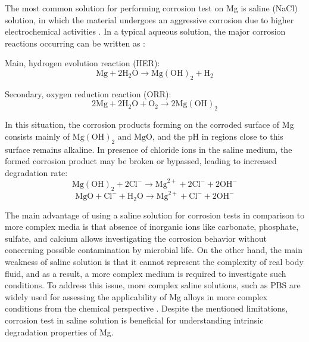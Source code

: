 The most common solution for performing corrosion test on Mg is saline (NaCl) solution, in which the material undergoes an aggressive corrosion due to higher electrochemical activities \cite{Hadzima2014,Lu2019}. In a typical aqueous solution, the major corrosion reactions occurring can be written as \cite{Li2020,Atrens2015}:

Main, hydrogen evolution reaction (HER):
\begin{equation}
\mathrm{Mg}+2 \mathrm{H}_{2} \mathrm{O} \rightarrow \mathrm{Mg}(\mathrm{OH})_{2}+\mathrm{H}_{2} 
\end{equation}

Secondary, oxygen reduction reaction (ORR):
\begin{equation}
2 \mathrm{Mg}+2 \mathrm{H}_{2} \mathrm{O}+\mathrm{O}_{2} \rightarrow 2 \mathrm{Mg}(\mathrm{OH})_{2}
\end{equation}

In this situation, the corrosion products forming on the corroded surface of Mg consists mainly of $\mathrm{Mg}(\mathrm{OH})_{2}$ and $\mathrm{MgO}$, and the pH in regions close to this surface remains alkaline. In presence of chloride ions in the saline medium, the formed corrosion product may be broken or bypassed, leading to increased degradation rate:
\begin{equation} \label{eq:break_react_intro}
\mathrm{Mg}(\mathrm{OH})_{2}+2 \mathrm{Cl}^{-} \rightarrow \mathrm{Mg}^{2+}+2 \mathrm{Cl}^{-}+2 \mathrm{OH}^{-}
\end{equation}
\begin{equation} \label{eq:break_react_mgo_intro}
\mathrm{MgO}+ \mathrm{Cl}^{-} + \mathrm{H}_{2} \mathrm{O} \rightarrow \mathrm{Mg}^{2+}+ \mathrm{Cl}^{-}+ 2\mathrm{OH}^{-}
\end{equation}


The main advantage of using a saline solution for corrosion tests in comparison to more complex media is that absence of inorganic ions like carbonate, phosphate, sulfate, and calcium allows investigating the corrosion behavior without concerning possible contamination by microbial life. On the other hand, the main weakness of saline solution is that it cannot represent the complexity of real body fluid, and as a result, a more complex medium is required to investigate such conditions. To address this issue, more complex saline solutions, such as PBS are widely used for assessing the applicability of Mg alloys in more complex conditions from the chemical perspective \cite{Schille2011,Xue2012}. Despite the mentioned limitations, corrosion test in saline solution is beneficial for understanding intrinsic degradation properties of Mg. 



